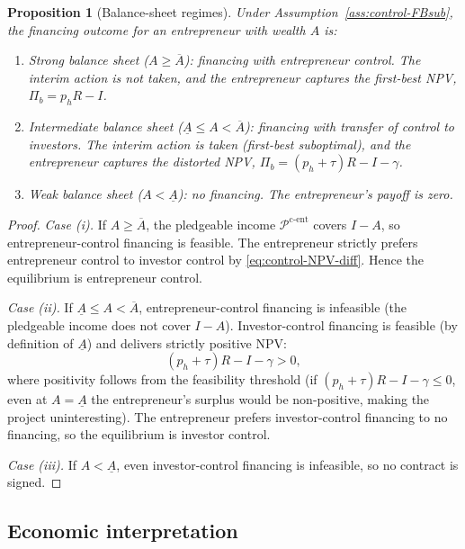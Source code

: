 \documentclass[11pt,a4paper,oneside]{book}
\def\leq{\leqslant}
\def\geq{\geqslant}
\theoremstyle{plain}
\newtheorem{proposition}[theorem]{Proposition}
\theoremstyle{definition}
\theoremstyle{remark}
\numberwithin{equation}{chapter}
\begin{document}
\begin{proposition}[Balance-sheet regimes]\label{prop:control-regimes}
Under Assumption~\ref{ass:control-FBsub}, the financing outcome for an entrepreneur with wealth $A$ is:
\begin{enumerate}
  \item[\textup{(i)}] \emph{Strong balance sheet} ($A \geq \overline{A}$): financing with entrepreneur control.
  The interim action is not taken, and the entrepreneur captures the first-best NPV, $\Pi_b = p_h R - I$.
  \item[\textup{(ii)}] \emph{Intermediate balance sheet} ($\underline{A} \leq A < \overline{A}$): financing with transfer of control to investors.
  The interim action is taken (first-best suboptimal), and the entrepreneur captures the distorted NPV, $\Pi_b = (p_h + \tau) R - I - \gamma$.
  \item[\textup{(iii)}] \emph{Weak balance sheet} ($A < \underline{A}$): no financing.
  The entrepreneur's payoff is zero.
\end{enumerate}
\end{proposition}

\begin{proof}
\emph{Case (i).}
If $A \geq \overline{A}$, the pledgeable income $\mathcal{P}^{\text{c-ent}}$ covers $I - A$, so entrepreneur-control financing is feasible.
The entrepreneur strictly prefers entrepreneur control to investor control by \eqref{eq:control-NPV-diff}.
Hence the equilibrium is entrepreneur control.

\emph{Case (ii).}
If $\underline{A} \leq A < \overline{A}$, entrepreneur-control financing is infeasible (the pledgeable income does not cover $I - A$).
Investor-control financing is feasible (by definition of $\underline{A}$) and delivers strictly positive NPV:
\begin{equation*}
  (p_h + \tau) R - I - \gamma > 0,
\end{equation*}
where positivity follows from the feasibility threshold (if $(p_h + \tau)R - I - \gamma \leq 0$, even at $A = \underline{A}$ the entrepreneur's surplus would be non-positive, making the project uninteresting).
The entrepreneur prefers investor-control financing to no financing, so the equilibrium is investor control.

\emph{Case (iii).}
If $A < \underline{A}$, even investor-control financing is infeasible, so no contract is signed.
\end{proof}

\subsection{Economic interpretation}
\end{document}

